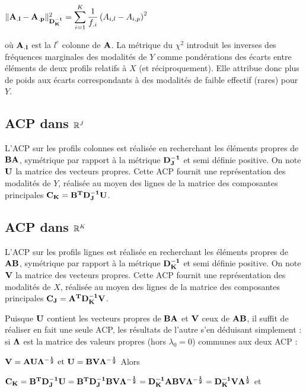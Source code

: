 \documentclass[letterpaper,10pt,french]{sphinxmanual}
\begin{document}
\sphinxAtStartPar
\(\Vert {\bf A_{.l}}-{\bf A_{.p}}\Vert^2_{{\bf D_K^{-1}}} = \displaystyle\sum_{i=1}^K\frac{1}{f_{.i}}\left (A_{i,l}-A_{i,p} \right )^2\)

\sphinxAtStartPar
où \({\bf A_{.l}}\) est la \(l^e\) colonne de \({\bf A}\). La métrique du \(\chi^2\) introduit les inverses
des fréquences marginales des modalités de \(Y\) comme pondérations des écarts
entre éléments de deux profils relatifs à \(X\) (et réciproquement). Elle attribue
donc plus de poids aux écarts correspondants à des modalités de faible effectif
(rares) pour \(Y\).


\subsection{ACP dans \protect\(\mathbb{R}^J\protect\)}
\label{\detokenize{afc:acp-dans-mathbb-r-j}}
\sphinxAtStartPar
L’ACP sur les profils colonnes est réalisée en recherchant les éléments propres de \({\bf BA}\), symétrique par rapport à la métrique \({\bf D_J^{-1}}\) et semi définie positive. On note \(\bf U\) la matrice des vecteurs propres. Cette ACP fournit une représentation des modalités de \(Y\), réalisée au moyen des lignes de la matrice des composantes principales \({\bf C_K}={\bf B^TD_J^{-1}U}\).


\subsection{ACP dans \protect\(\mathbb{R}^K\protect\)}
\label{\detokenize{afc:acp-dans-mathbb-r-k}}
\sphinxAtStartPar
L’ACP sur les profils lignes est réalisée en recherchant les éléments propres de \({\bf AB}\), symétrique par rapport à la métrique \({\bf D_K^{-1}}\) et semi définie positive. On note \(\bf V\) la matrice des vecteurs propres. Cette ACP fournit une représentation des modalités de \(X\), réalisée au moyen des lignes de la matrice des composantes principales \({\bf C_J}={\bf A^TD_K^{-1}V}\).

\sphinxAtStartPar
Puisque \(\bf U\) contient les vecteurs propres de \({\bf BA}\) et \(\bf V\) ceux de \({\bf AB}\), il suffit de réaliser en fait une seule ACP, les résultats de l’autre s’en déduisant simplement : si \(\bf \Lambda\) est la matrice des valeurs propres (hors \(\lambda_0=0\)) communes aux deux ACP :

\sphinxAtStartPar
\({\bf V} ={\bf AU\Lambda^{-\frac{1}{2}}}\textrm {  et  } {\bf U} ={\bf BV\Lambda^{-\frac{1}{2}}}\)
Alors

\sphinxAtStartPar
\({\bf C_K}={\bf B^TD_J^{-1}U }= {\bf B^TD_J^{-1}BV\Lambda^{-\frac{1}{2}}} = {\bf D_K^{-1}ABV \Lambda^{-\frac{1}{2}}} =  {\bf D_K^{-1}V \Lambda^{\frac{1}{2}}}\)
et
\end{document}
